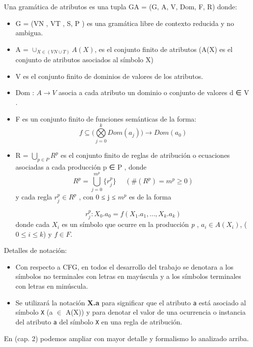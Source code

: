 \begin{definition}
\label{def:grammarattr}
Una gramática de atributos es una tupla GA = (G, A, V, Dom, F, R) donde:
\begin{itemize}
\item G = (VN , VT , S, P ) es una gramática libre de contexto reducida y no ambigua.
\item A = $\cup_{X\in(VN \cup T)} A(X)$, es el conjunto finito de atributos (A(X) es el conjunto de atributos asociados al símbolo X)

\item V es el conjunto finito de dominios de valores de los atributos.
\item Dom : $A\rightarrow V$ asocia a cada atributo un dominio o conjunto de valores d ∈ V .
\item F es un conjunto finito de funciones semánticas de la forma:
\begin{equation}
f \subseteq (\bigotimes\limits_{j=0}^{k}{ Dom(a_{j} ))\rightarrow Dom(a_{0})}
\end{equation}

\item R = $\bigcup _{p∈P} R^{p}$ es el conjunto finito de reglas de atribución o ecuaciones asociadas a cada producción p ∈ P , donde
\begin{equation}
R^{p} = \bigcup\limits_{j=0}^{m^{p}}{\{r_{j}^{p}\}}\ \ \ \ \ \ (\#(R^{p} ) = m^{p} ≥ 0)
\end{equation}
y cada regla $r_{j}^{p} \in R^{p}$ , con 0 ≤ j ≤ $m^{p}$ es de la forma

\begin{equation}
r_{j}^{p}: X_{0}.a_{0} = f(X_{1}.a_{1} ,\dots , X_{k}.a_{k})
\end{equation} 
donde cada $X_{i}$ es un símbolo que ocurre en la producción \textit{p} , $a_{i} \in A(X_{i})$, ($0 \leqslant i \leqslant k$) y $f \in F$.

\end{itemize}
\end{definition}

Detalles de notación:
\begin{itemize}
\item Con respecto a CFG, en todos el desarrollo del trabajo se denotara a los símbolos no terminales con letras en mayúscula y a los símbolos terminales con letras en minúscula.
\item Se utilizará la notación \textbf{X.a} para significar que el atributo \texttt{a} está asociado al símbolo \texttt{X} (a $\in$ A(X)) y para denotar el valor de una ocurrencia o instancia del atributo \texttt{a} del símbolo \texttt{X} en una regla de atribución.

\end{itemize}
En \cite{tesismarcelo} (cap. 2) podemos ampliar con mayor detalle y formalismo lo analizado arriba.
